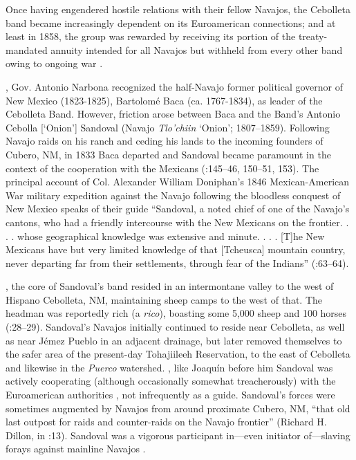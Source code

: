   Once having engendered hostile relations with their fellow Navajos, the Cebolleta band became increasingly dependent on its Euroamerican connections; and at least in 1858, the group was rewarded by receiving its portion of the treaty-mandated annuity intended for all Navajos but withheld from every other band owing to ongoing war \citep[30]{Correll1970}.  

\citealt{In1825}, Gov. Antonio Narbona recognized the half-Navajo former political governor of New Mexico (1823-1825), Bartolomé Baca (ca. 1767-1834), as leader of the Cebolleta Band.  However, friction arose between Baca and the Band’s Antonio Cebolla [‘Onion’] Sandoval (Navajo \textit{Tlo’chiin} ‘Onion’; 1807–1859).  Following Navajo raids on his ranch and ceding his lands to the incoming founders of Cubero, NM, in 1833 Baca departed and Sandoval became paramount in the context of the cooperation with the Mexicans (\citealt{Acrey1988}:145–46, 150–51, 153).  The principal account of Col. Alexander William Doniphan’s 1846 Mexican-American War military expedition against the Navajo following the bloodless conquest of New Mexico speaks of their guide “Sandoval, a noted chief of one of the Navajo’s cantons, who had a friendly intercourse with the New Mexicans on the frontier. . . . whose geographical knowledge was extensive and minute. . . .  [T]he New Mexicans have but very limited knowledge of that [Tcheusca] mountain country, never departing far from their settlements, through fear of the Indians” (\citealt{Hughes1848}:63–64).  

\citealt{In1846}, the core of Sandoval’s band resided in an intermontane valley to the west of Hispano Cebolleta, NM, maintaining sheep camps to the west of that.  The headman was reportedly rich (a \textit{rico}), boasting some 5,000 sheep and 100 horses (\citealt{Robinson1848}:28–29).  Sandoval’s Navajos initially continued to reside near Cebolleta, as well as near Jémez Pueblo in an adjacent drainage, but later removed themselves to the safer area of the present-day Tohajiileeh Reservation, to the east of Cebolleta and likewise in the \textit{Puerco} watershed.  \citealt{By1845}, like Joaquín before him Sandoval was actively cooperating (although occasionally somewhat treacherously) with the Euroamerican authorities \citep{Correll1970}, not infrequently as a guide.  Sandoval’s forces were sometimes augmented by Navajos from around proximate Cubero, NM, “that old last outpost for raids and counter-raids on the Navajo frontier” (Richard H. Dillon, in \citealt{Rice1970}:13).  Sandoval was a vigorous participant in—even initiator of—slaving forays against mainline Navajos \citep[26]{Bailey1964b}.

